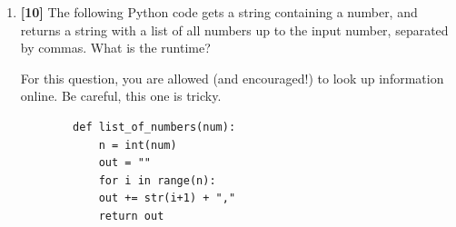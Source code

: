 \documentclass{article}
\begin{document}
\begin{enumerate}
\begin{enumerate}
	\item{\bf [1 (Bonus)]} Give an implementation of the same algorithm with better worst-case and average-case runtime.
		\end{enumerate}

\item {\bf [10]} The following Python code gets a string containing a number, and returns a string with a list of all numbers up to the input number, separated by commas.  What is the runtime? 

	For this question, you are allowed (and encouraged!) to look up information online. Be careful, this one is tricky.

	\begin{verbatim}
		def list_of_numbers(num):
		    n = int(num)
		    out = ""
		    for i in range(n):
			out += str(i+1) + ","
		    return out
	\end{verbatim}
\end{enumerate}
\end{document}
